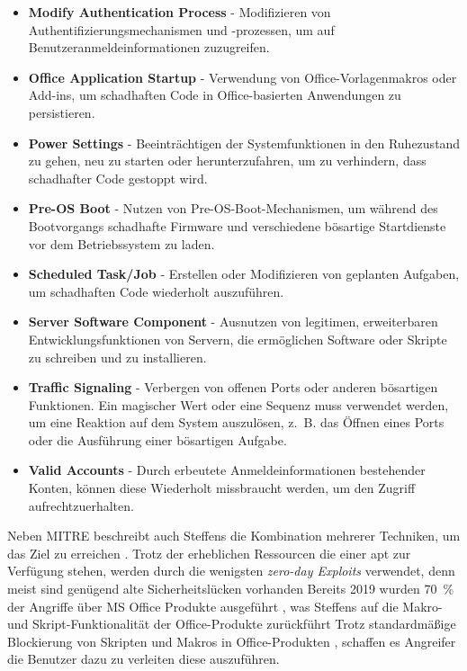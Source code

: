 \documentclass[conference]{IEEEtran}
\begin{document}
\begin{itemize}
    \item \textbf{Modify Authentication Process} - Modifizieren von Authentifizierungsmechanismen und -prozessen, um auf Benutzeranmeldeinformationen zuzugreifen.
    \item \textbf{Office Application Startup} - Verwendung von Office-Vorlagenmakros oder Add-ins, um schadhaften Code in Office-basierten Anwendungen zu persistieren.
    \item \textbf{Power Settings} - Beeinträchtigen der Systemfunktionen in den Ruhezustand zu gehen, neu zu starten oder herunterzufahren, um zu verhindern, dass schadhafter Code gestoppt wird.
    \item \textbf{Pre-OS Boot} - Nutzen von Pre-OS-Boot-Mechanismen, um während des Bootvorgangs schadhafte Firmware und verschiedene bösartige Startdienste vor dem Betriebssystem zu laden.
    \item \textbf{Scheduled Task/Job} - Erstellen oder Modifizieren von geplanten Aufgaben, um schadhaften Code wiederholt auszuführen.
    \item \textbf{Server Software Component} - Ausnutzen von legitimen, erweiterbaren Entwicklungsfunktionen von Servern, die ermöglichen Software oder Skripte zu schreiben und zu installieren.
    \item \textbf{Traffic Signaling} - Verbergen von offenen Ports oder anderen bösartigen Funktionen. Ein magischer Wert oder eine Sequenz muss verwendet werden, um eine Reaktion auf dem System auszulösen, z.~B. das Öffnen eines Ports oder die Ausführung einer bösartigen Aufgabe.
    \item \textbf{Valid Accounts} - Durch erbeutete Anmeldeinformationen bestehender Konten, können diese Wiederholt missbraucht werden, um den Zugriff aufrechtzuerhalten.
\end{itemize}

Neben MITRE beschreibt auch Steffens die Kombination mehrerer Techniken, um das Ziel zu erreichen \cite[S.~16]{Steffens2020}.
Trotz der erheblichen Ressourcen die einer \ac{apt} zur Verfügung stehen, werden durch die wenigsten \textit{zero-day Exploits} verwendet, denn meist sind genügend alte Sicherheitslücken vorhanden \cite[S.~15]{Statista2023}
Bereits 2019 wurden 70~\% der Angriffe über MS Office Produkte ausgeführt \cite{Statista2019}, was Steffens auf die Makro- und Skript-Funktionalität der Office-Produkte zurückführt \cite[S.~15]{Steffens2020}
Trotz standardmäßige Blockierung von Skripten und Makros in Office-Produkten \cite{nicholasswhite2023}, schaffen es Angreifer die Benutzer dazu zu verleiten diese auszuführen.
\end{document}
